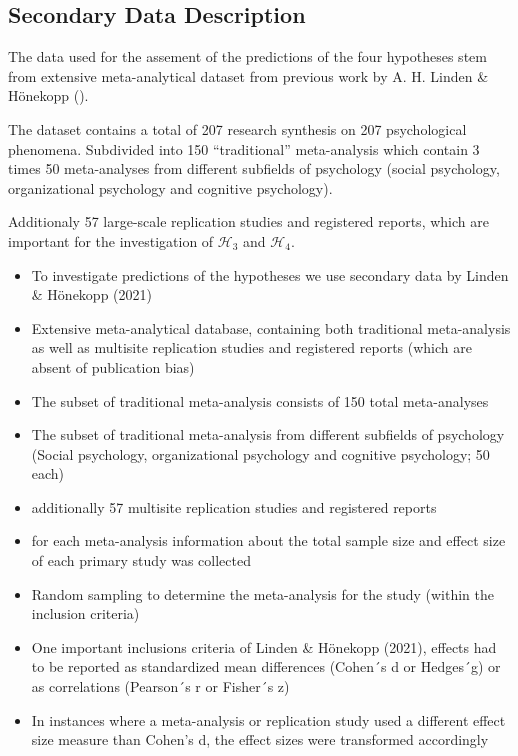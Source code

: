 \documentclass[
  12pt,
]{scrartcl}
\providecommand{\tightlist}{%
  \setlength{\itemsep}{0pt}\setlength{\parskip}{0pt}}\usepackage{longtable,booktabs,array}
\begin{document}
\subsection{Secondary Data
Description}\label{secondary-data-description}

The data used for the assement of the predictions of the four hypotheses
stem from extensive meta-analytical dataset from previous work by A. H.
Linden \& Hönekopp ().

The dataset contains a total of 207 research synthesis on 207
psychological phenomena. Subdivided into 150 ``traditional''
meta-analysis which contain 3 times 50 meta-analyses from different
subfields of psychology (social psychology, organizational psychology
and cognitive psychology).

Additionaly 57 large-scale replication studies and registered reports,
which are important for the investigation of \(\mathcal{H}_3\) and
\(\mathcal{H}_4\).

\begin{itemize}
\tightlist
\item
  To investigate predictions of the hypotheses we use secondary data by
  Linden \& Hönekopp (2021)
\item
  Extensive meta-analytical database, containing both traditional
  meta-analysis as well as multisite replication studies and registered
  reports (which are absent of publication bias)
\item
  The subset of traditional meta-analysis consists of 150 total
  meta-analyses
\item
  The subset of traditional meta-analysis from different subfields of
  psychology (Social psychology, organizational psychology and cognitive
  psychology; 50 each)
\item
  additionally 57 multisite replication studies and registered reports
\item
  for each meta-analysis information about the total sample size and
  effect size of each primary study was collected
\item
  Random sampling to determine the meta-analysis for the study (within
  the inclusion criteria)
\item
  One important inclusions criteria of Linden \& Hönekopp (2021),
  effects had to be reported as standardized mean differences (Cohen´s d
  or Hedges´g) or as correlations (Pearson´s r or Fisher´s z)
\item
  In instances where a meta-analysis or replication study used a
  different effect size measure than Cohen's d, the effect sizes were
  transformed accordingly
\end{itemize}
\end{document}
